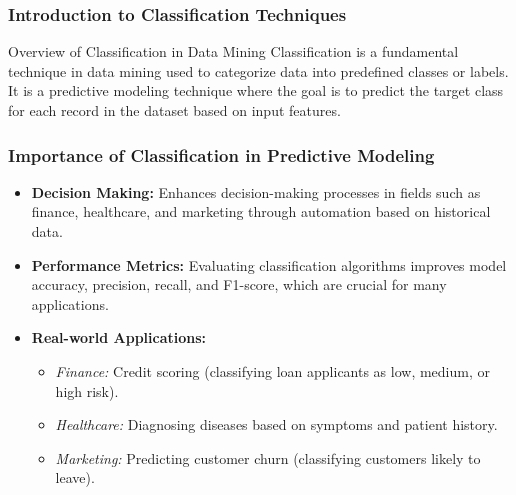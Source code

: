 \documentclass[aspectratio=169]{beamer}
\begin{document}
\frame{\titlepage}

\begin{frame}[fragile]
    \frametitle{Introduction to Classification Techniques}
    \begin{block}{Overview of Classification in Data Mining}
        Classification is a fundamental technique in data mining used to categorize data into predefined classes or labels. It is a predictive modeling technique where the goal is to predict the target class for each record in the dataset based on input features.
    \end{block}
\end{frame}

\begin{frame}[fragile]
    \frametitle{Importance of Classification in Predictive Modeling}
    \begin{itemize}
        \item \textbf{Decision Making:} Enhances decision-making processes in fields such as finance, healthcare, and marketing through automation based on historical data.
        
        \item \textbf{Performance Metrics:} Evaluating classification algorithms improves model accuracy, precision, recall, and F1-score, which are crucial for many applications.
        
        \item \textbf{Real-world Applications:}
        \begin{itemize}
            \item \textit{Finance:} Credit scoring (classifying loan applicants as low, medium, or high risk).
            \item \textit{Healthcare:} Diagnosing diseases based on symptoms and patient history.
            \item \textit{Marketing:} Predicting customer churn (classifying customers likely to leave).
        \end{itemize}
    \end{itemize}
\end{frame}
\end{document}
